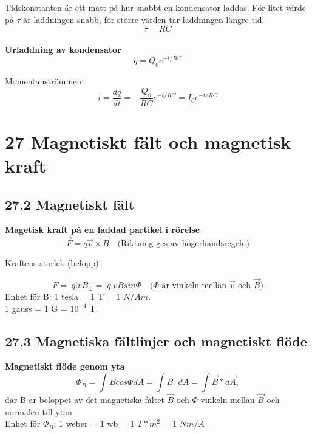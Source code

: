 \documentclass[a4paper]{article}
\begin{document}
Tidskonstanten är ett mått på hur snabbt en kondensator laddas. För litet värde på $\tau$ är laddningen snabb, för större värden tar laddningen längre tid.
\begin{equation}
\tau = RC
\end{equation}
\\
\textbf{Urladdning av kondensator}
\begin{equation}
q = Q_0e^{-t/RC}
\end{equation}

Momentanströmmen:
\begin{equation}
i = \dfrac{dq}{dt} = - \dfrac{Q_0}{RC} e^{-t/RC} = I_0 e^{-t/RC}
\end{equation}

\section*{27 Magnetiskt fält och magnetisk kraft}
\subsection*{27.2 Magnetiskt fält}

\textbf{Magetisk kraft på en laddad partikel i rörelse}
\begin{equation}
\vec{F} = q \vec{v} \times \vec{B} \quad \text{(Riktning ges av högerhandsregeln)}
\end{equation}

Kraftens storlek (belopp):

\begin{equation}
F = |q|vB_{\bot} = |q|vBsin\Phi \quad \text{($\Phi$ är vinkeln mellan $\vec{v}$ och $\vec{B}$)}
\end{equation}
Enhet för B: 1 tesla = 1 T = 1 $N/Am$. \\ 1 gauss = 1 G = $10^{-4}$ T.

\subsection*{27.3 Magnetiska fältlinjer och magnetiskt flöde}
\textbf{Magnetiskt flöde genom yta}
\begin{equation}
\Phi_B = \int B cos \Phi dA = \int B_\bot dA = \int \vec{B} * d \vec{A},
\end{equation}
där B är beloppet av det magnetiska fältet $\vec{B}$ och  $\Phi$ vinkeln mellan $\vec{B}$ och normalen till ytan.  \\[2 mm]
Enhet för $\Phi_B$: 1 weber = 1 wb = 1 $T*m^2$ = 1 $Nm/A$ 
\\
\end{document}
